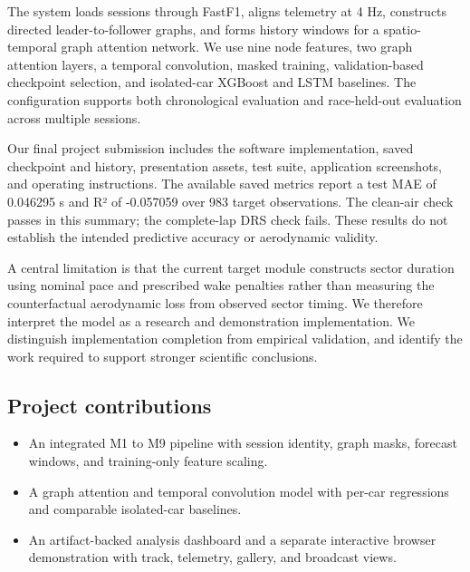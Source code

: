 \documentclass[11pt,a4paper,oneside]{report}
\begin{document}
The system loads sessions through FastF1, aligns telemetry at 4 Hz, constructs directed leader-to-follower graphs, and forms history windows for a spatio-temporal graph attention network. We use nine node features, two graph attention layers, a temporal convolution, masked training, validation-based checkpoint selection, and isolated-car XGBoost and LSTM baselines. The configuration supports both chronological evaluation and race-held-out evaluation across multiple sessions.

Our final project submission includes the software implementation, saved checkpoint and history, presentation assets, test suite, application screenshots, and operating instructions. The available saved metrics report a test MAE of 0.046295 s and R² of -0.057059 over 983 target observations. The clean-air check passes in this summary; the complete-lap DRS check fails. These results do not establish the intended predictive accuracy or aerodynamic validity.

A central limitation is that the current target module constructs sector duration using nominal pace and prescribed wake penalties rather than measuring the counterfactual aerodynamic loss from observed sector timing. We therefore interpret the model as a research and demonstration implementation. We distinguish implementation completion from empirical validation, and identify the work required to support stronger scientific conclusions.

\subsection*{Project contributions}

\begin{itemize}[leftmargin=2em]\item An integrated M1 to M9 pipeline with session identity, graph masks, forecast windows, and training-only feature scaling.\end{itemize}

\begin{itemize}[leftmargin=2em]\item A graph attention and temporal convolution model with per-car regressions and comparable isolated-car baselines.\end{itemize}

\begin{itemize}[leftmargin=2em]\item An artifact-backed analysis dashboard and a separate interactive browser demonstration with track, telemetry, gallery, and broadcast views.\end{itemize}
\end{document}
